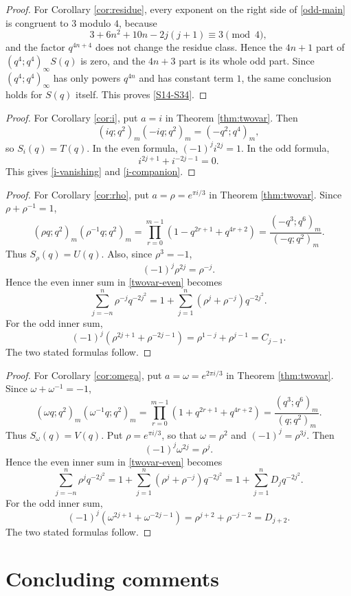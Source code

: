 \documentclass[11pt]{amsart}
\theoremstyle{remark}
\begin{document}
\begin{proof}
For Corollary \ref{cor:residue}, every exponent on the right side of \eqref{odd-main} is congruent to $3$ modulo $4$, because
\[
3+6n^2+10n-2j(j+1)\equiv3\pmod4,
\]
and the factor $q^{4n+4}$ does not change the residue class.  Hence the $4n+1$ part of $(q^4;q^4)_\infty S(q)$ is zero, and the $4n+3$ part is its whole odd part.  Since $(q^4;q^4)_\infty$ has only powers $q^{4n}$ and has constant term $1$, the same conclusion holds for $S(q)$ itself.  This proves \eqref{S14-S34}.
\end{proof}

\begin{proof}
For Corollary \ref{cor:i}, put $a=i$ in Theorem \ref{thm:twovar}.  Then
\[
(iq;q^2)_m(-iq;q^2)_m=(-q^2;q^4)_m,
\]
so $S_i(q)=T(q)$.  In the even formula, $(-1)^j i^{2j}=1$.  In the odd formula,
\[
i^{2j+1}+i^{-2j-1}=0.
\]
This gives \eqref{i-vanishing} and \eqref{i-companion}.
\end{proof}

\begin{proof}
For Corollary \ref{cor:rho}, put $a=\rho=e^{\pi i/3}$ in Theorem \ref{thm:twovar}.  Since
$\rho+\rho^{-1}=1$,
\[
(\rho q;q^2)_m(\rho^{-1}q;q^2)_m
=\prod_{r=0}^{m-1}(1-q^{2r+1}+q^{4r+2})
=\frac{(-q^3;q^6)_m}{(-q;q^2)_m}.
\]
Thus $S_\rho(q)=U(q)$.  Also, since $\rho^3=-1$,
\[
(-1)^j\rho^{2j}=\rho^{-j}.
\]
Hence the even inner sum in \eqref{twovar-even} becomes
\[
\sum_{j=-n}^{n}\rho^{-j}q^{-2j^2}
=1+\sum_{j=1}^{n}(\rho^j+\rho^{-j})q^{-2j^2}.
\]
For the odd inner sum,
\[
(-1)^j(\rho^{2j+1}+\rho^{-2j-1})
=\rho^{1-j}+\rho^{j-1}=C_{j-1}.
\]
The two stated formulas follow.
\end{proof}

\begin{proof}
For Corollary \ref{cor:omega}, put $a=\omega=e^{2\pi i/3}$ in Theorem \ref{thm:twovar}.  Since
$\omega+\omega^{-1}=-1$,
\[
(\omega q;q^2)_m(\omega^{-1}q;q^2)_m
=\prod_{r=0}^{m-1}(1+q^{2r+1}+q^{4r+2})
=\frac{(q^3;q^6)_m}{(q;q^2)_m}.
\]
Thus $S_\omega(q)=V(q)$.  Put $\rho=e^{\pi i/3}$, so that $\omega=\rho^2$ and $(-1)^j=\rho^{3j}$.  Then
\[
(-1)^j\omega^{2j}=\rho^j.
\]
Hence the even inner sum in \eqref{twovar-even} becomes
\[
\sum_{j=-n}^{n}\rho^jq^{-2j^2}
=1+\sum_{j=1}^{n}(\rho^j+\rho^{-j})q^{-2j^2}
=1+\sum_{j=1}^{n}D_jq^{-2j^2}.
\]
For the odd inner sum,
\[
(-1)^j(\omega^{2j+1}+\omega^{-2j-1})
=\rho^{j+2}+\rho^{-j-2}=D_{j+2}.
\]
The two stated formulas follow.
\end{proof}

\section{Concluding comments}
\end{document}
